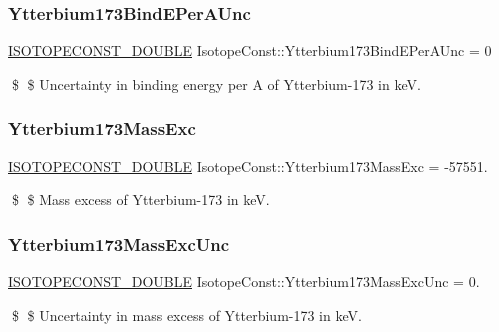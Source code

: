 \subsubsection{\texorpdfstring{Ytterbium173\+Bind\+E\+Per\+A\+Unc}{Ytterbium173BindEPerAUnc}}
{\footnotesize\ttfamily \mbox{\hyperlink{group___isotope_const-_macros_ga8f45a7272ce02c0b4c65c44636ed719a}{I\+S\+O\+T\+O\+P\+E\+C\+O\+N\+S\+T\+\_\+\+D\+O\+U\+B\+LE}} Isotope\+Const\+::\+Ytterbium173\+Bind\+E\+Per\+A\+Unc = 0}

\$ \$ Uncertainty in binding energy per A of Ytterbium-\/173 in keV. \mbox{\label{group___isotope_const-_ytterbium-_yb173_ga2dc6da3a2bd28abe1b2569cff5b526df}} 
\subsubsection{\texorpdfstring{Ytterbium173\+Mass\+Exc}{Ytterbium173MassExc}}
{\footnotesize\ttfamily \mbox{\hyperlink{group___isotope_const-_macros_ga8f45a7272ce02c0b4c65c44636ed719a}{I\+S\+O\+T\+O\+P\+E\+C\+O\+N\+S\+T\+\_\+\+D\+O\+U\+B\+LE}} Isotope\+Const\+::\+Ytterbium173\+Mass\+Exc = -\/57551.}

\$ \$ Mass excess of Ytterbium-\/173 in keV. \mbox{\label{group___isotope_const-_ytterbium-_yb173_ga043034d5d489ee07e751a7053e17624c}} 
\subsubsection{\texorpdfstring{Ytterbium173\+Mass\+Exc\+Unc}{Ytterbium173MassExcUnc}}
{\footnotesize\ttfamily \mbox{\hyperlink{group___isotope_const-_macros_ga8f45a7272ce02c0b4c65c44636ed719a}{I\+S\+O\+T\+O\+P\+E\+C\+O\+N\+S\+T\+\_\+\+D\+O\+U\+B\+LE}} Isotope\+Const\+::\+Ytterbium173\+Mass\+Exc\+Unc = 0.}

\$ \$ Uncertainty in mass excess of Ytterbium-\/173 in keV. \mbox{\label{group___isotope_const-_ytterbium-_yb173_ga0d6e33e7ae5dc9164442169d8de2f5b5}} 
